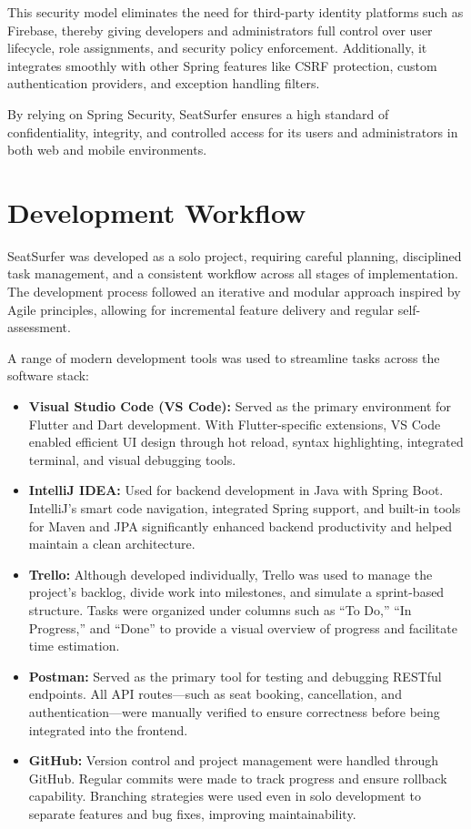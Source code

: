 \documentclass[12pt,a4paper]{report} %
\begin{document}
\noindent
This security model eliminates the need for third-party identity platforms such as Firebase, thereby giving developers and administrators full control over user lifecycle, role assignments, and security policy enforcement. Additionally, it integrates smoothly with other Spring features like CSRF protection, custom authentication providers, and exception handling filters.

By relying on Spring Security, SeatSurfer ensures a high standard of confidentiality, integrity, and controlled access for its users and administrators in both web and mobile environments.

\section{Development Workflow}

SeatSurfer was developed as a solo project, requiring careful planning, disciplined task management, and a consistent workflow across all stages of implementation. The development process followed an iterative and modular approach inspired by Agile principles, allowing for incremental feature delivery and regular self-assessment.

A range of modern development tools was used to streamline tasks across the software stack:

\begin{itemize}
    \item \textbf{Visual Studio Code (VS Code):} Served as the primary environment for Flutter and Dart development. With Flutter-specific extensions, VS Code enabled efficient UI design through hot reload, syntax highlighting, integrated terminal, and visual debugging tools.

    \item \textbf{IntelliJ IDEA:} Used for backend development in Java with Spring Boot. IntelliJ's smart code navigation, integrated Spring support, and built-in tools for Maven and JPA significantly enhanced backend productivity and helped maintain a clean architecture.

    \item \textbf{Trello:} Although developed individually, Trello was used to manage the project's backlog, divide work into milestones, and simulate a sprint-based structure. Tasks were organized under columns such as “To Do,” “In Progress,” and “Done” to provide a visual overview of progress and facilitate time estimation.

    \item \textbf{Postman:} Served as the primary tool for testing and debugging RESTful endpoints. All API routes—such as seat booking, cancellation, and authentication—were manually verified to ensure correctness before being integrated into the frontend.

    \item \textbf{GitHub:} Version control and project management were handled through GitHub. Regular commits were made to track progress and ensure rollback capability. Branching strategies were used even in solo development to separate features and bug fixes, improving maintainability.
\end{itemize}
\end{document}
